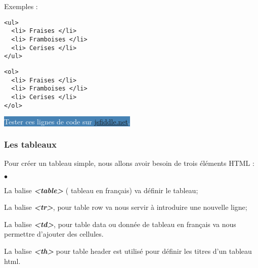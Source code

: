 \documentclass[10pt,dvipsnames, dvips, svgnames]{article}
\begin{document}
Exemples :


\begin{minipage}[t]{0.5\linewidth}
\begin{lstlisting}
<ul>
  <li> Fraises </li>
  <li> Framboises </li>
  <li> Cerises </li>
</ul>
\end{lstlisting}
\end{minipage}
\begin{minipage}[t]{0.5\linewidth}
\begin{lstlisting}
<ol>
  <li> Fraises </li>
  <li> Framboises </li>
  <li> Cerises </li>
</ol>
\end{lstlisting}
\end{minipage}

\hypersetup{urlcolor=white}
\colorbox{SteelBlue}{\textcolor{white}{Tester ces lignes de code sur \href{https://jsfiddle.net/}{jsfiddle.net}.}}
\hypersetup{urlcolor=blue}




\subsubsection{Les tableaux}

Pour créer un tableau simple, nous allons avoir besoin de trois éléments HTML :

\begin{list}{$\bullet$}{}
\item La balise \textbf{\textit{<table>}} ( \og  tableau \fg en français) va définir le tableau;
\item     La balise \textbf{\textit{<tr>}}, pour \og   table row \fg  va nous servir à introduire une nouvelle ligne;
\item     La balise \textbf{\textit{<td>}}, pour \og table data \fg ou \og  donnée de tableau  \fg en français va nous permettre d'ajouter des cellules.
\item La balise \textbf{\textit{<th>}} pour \og   table header \fg  est utilisé pour définir les titres d'un tableau html. %
\end{list}
\end{document}
